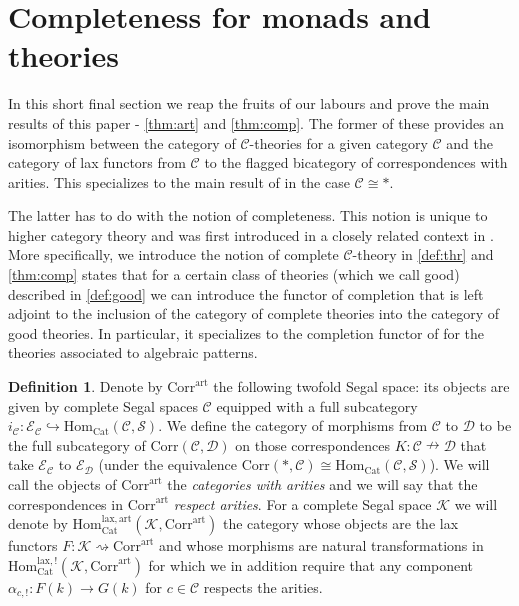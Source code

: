 \documentclass[a4paper, reqno]{amsart}
\theoremstyle{definition}
\newtheorem{defn}[theorem]{Definition}
\newcommand\cC{\mathscr C}
\newcommand\cD{\mathscr D}
\newcommand\cE{\mathscr E}
\newcommand\cK{\mathscr K}
\newcommand\cS{\mathscr S}
\newcommand\art{\mathrm{art}}
\newcommand\mor{\mathrm{Hom}}
\newcommand\cat{\mathrm{Cat}}
\newcommand\corr{\mathrm{Corr}}
\newcommand\lax{\mathrm{lax}}
\begin{document}
\section{Completeness for monads and theories}\label{sect:six}
In this short final section we reap the fruits of our labours and prove the main results of this paper - \cref{thm:art} and \cref{thm:comp}. The former of these provides an isomorphism between the category of $\cC$-theories for a given category $\cC$ and the category of lax functors from $\cC$ to the flagged bicategory of correspondences with arities. This specializes to the main result of \cite{berger2012monads} in the case $\cC\cong*$.\par
The latter has to do with the notion of completeness. This notion is unique to higher category theory and was first introduced in a closely related context in \cite{chu2019homotopy}. More specifically, we introduce the notion of complete $\cC$-theory in \cref{def:thr} and \cref{thm:comp} states that for a certain class of theories (which we call good) described in \cref{def:good} we can introduce the functor of completion that is left adjoint to the inclusion of the category of complete theories into the category of good theories. In particular, it specializes to the completion functor of \cite{chu2019homotopy} for the theories associated to algebraic patterns.
\begin{defn}
Denote by $\corr^\art$ the following twofold Segal space: its objects are given by complete Segal spaces $\cC$ equipped with a full subcategory $i_\cC:\cE_\cC\hookrightarrow\mor_\cat(\cC,\cS)$. We define the category of morphisms from $\cC$ to $\cD$ to be the full subcategory of $\corr(\cC,\cD)$ on those correspondences $K:\cC\nrightarrow\cD$ that take $\cE_\cC$ to $\cE_\cD$ (under the equivalence $\corr(*,\cC)\cong\mor_\cat(\cC,\cS)$). We will call the objects of $\corr^\art$ the \textit{categories with arities} and we will say that the correspondences in $\corr^\art$ \textit{respect arities}. For a complete Segal space $\cK$ we will denote by $\mor^{\lax,\art}_\cat(\cK,\corr^\art)$ the category whose objects are the lax functors $F:\cK\rightsquigarrow\corr^\art$ and whose morphisms are natural transformations in $\mor^{\lax,!}_\cat(\cK,\corr^\art)$ for which we in addition require that any component $\alpha_{c,!}:F(k)\rightarrow G(k)$ for $c\in\cC$ respects the arities.
\end{defn}
\end{document}
